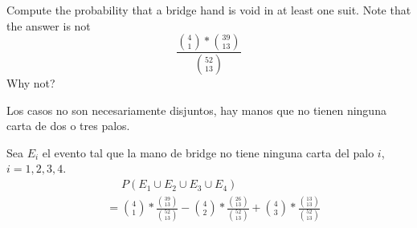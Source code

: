 \item Compute the probability that a bridge hand is void in at least one suit. Note that the answer is not
\[ \frac{\binom{4}{1} * \binom{39}{13}}{\binom{52}{13}} \]
Why not?

Los casos no son necesariamente disjuntos, hay manos que no tienen ninguna carta de dos o tres palos.

Sea $E_i$ el evento tal que la mano de bridge no tiene ninguna carta del palo $i$, $i = 1,2,3,4$.
\begin{align*}
    &\phantom{{}={}} P(E_1\cup E_2\cup E_3\cup E_4)\\
    &= \binom{4}{1} * \frac{\binom{39}{13}}{\binom{52}{13}}
    -  \binom{4}{2} * \frac{\binom{26}{13}}{\binom{52}{13}} + \binom{4}{3} * \frac{\binom{13}{13}}{\binom{52}{13}}
\end{align*}